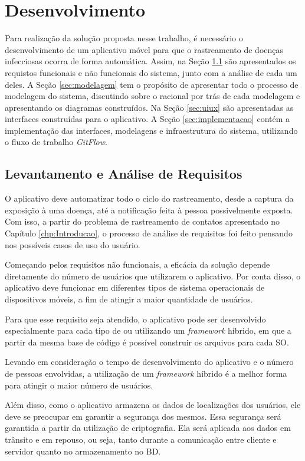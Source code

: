 \chapter{Desenvolvimento}\label{chp:desenvolvimento}

Para realização da solução proposta nesse trabalho, é necessário o desenvolvimento de um aplicativo móvel para que o rastreamento de doenças infecciosas ocorra de forma automática. Assim, na Seção \ref{sec:requisitos} são apresentados os requistos funcionais e não funcionais do sistema, junto com a análise de cada um deles. A Seção \ref{sec:modelagem} tem o propósito de apresentar todo o processo de modelagem do sistema, discutindo sobre o racional por trás de cada modelagem e apresentando os diagramas construídos. Na Seção \ref{sec:uiux} são apresentadas as interfaces construídas para o aplicativo. A Seção \ref{sec:implementacao} contém a implementação das interfaces, modelagens e infraestrutura do sistema, utilizando o fluxo de trabalho \textit{GitFlow}.

\section{Levantamento e Análise de Requisitos}\label{sec:requisitos}
O aplicativo deve automatizar todo o ciclo do rastreamento, desde a captura da exposição à uma doença, até a notificação feita à pessoa possivelmente exposta. Com isso, a partir do problema de rastreamento de contatos apresentado no Capítulo \ref{chp:Introducao}, o processo de análise de requisitos foi feito pensando nos possíveis casos de uso do usuário.

Começando pelos requisitos não funcionais, a eficácia da solução depende diretamente do número de usuários que utilizarem o aplicativo. Por conta disso, o aplicativo deve funcionar em diferentes tipos de sistema operacionais de dispositivos móveis, a fim de atingir a maior quantidade de usuários.

Para que esse requisito seja atendido, o aplicativo pode ser desenvolvido especialmente para cada tipo de  ou utilizando um \textit{framework} híbrido, em que a partir da mesma base de código é possível construir os arquivos para cada SO.

Levando em consideração o tempo de desenvolvimento do aplicativo e o número de pessoas envolvidas, a utilização de um \textit{framework} híbrido é a melhor forma para atingir o maior número de usuários.

Além disso, como o aplicativo armazena os dados de localizações dos usuários, ele deve se preocupar em garantir a segurança dos mesmos. Essa segurança será garantida a partir da utilização de criptografia. Ela será aplicada aos dados em trânsito e em repouso, ou seja, tanto durante a comunicação entre cliente e servidor quanto no armazenamento no BD.

